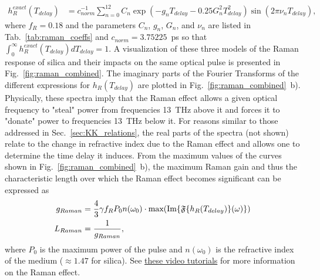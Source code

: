 \begin{align}
\label{eq:Raman_exact}
    h_R^{exact}(T_{delay})&=c^{-1}_{norm}\sum_{n=0}^{12}C_n\exp\left(- g_nT_{delay}-0.25G_n^2T^2_{delay}  \right)\sin\left(2\pi \nu_nT_{delay} \right),
\end{align}
where $f_R=0.18$ and the parameters $C_n$, $g_n$, $G_n$, and $\nu_n$ are listed in Tab.~\ref{tab:raman_coeffs} and $c_{norm}=3.75225$~ps so that $\int_0^\infty h_R^{exact}(T_{delay}) dT_{delay}=1$. A visualization of these three models of the Raman response of silica and their impacts on the same optical pulse is presented in Fig.~\ref{fig:raman_combined}. The imaginary parts of the Fourier Transforms of the different expressions for $h_R(T_{delay})$ are plotted in Fig.~\ref{fig:raman_combined}~b). Physically, these spectra imply that the Raman effect allows a given optical frequency to "steal" power from frequencies 13~THz above it and forces it to "donate" power to frequencies 13~THz below it. For reasons similar to those addressed in Sec.~\ref{sec:KK_relations}, the real parts of the spectra (not shown) relate to the change in refractive index due to the Raman effect and allows one to determine the time delay it induces. From the maximum values of the curves shown in Fig.~\ref{fig:raman_combined}~b), the maximum Raman gain and thus the characteristic length over which the Raman effect becomes significant can be expressed as
\begin{align}
    g_{Raman} &= \frac{4}{3} \gamma f_R P_0 n(\omega_0)\cdot \text{max}( \text{Im} \{ \mathfrak{F} \{ h_R(T_{delay}) \}(\omega) \} )\\ 
    L_{Raman} &= \frac{1}{g_{Raman}},
\end{align}
where $P_0$ is the maximum power of the pulse and $n(\omega_0)$ is the refractive index of the medium ($\approx 1.47$ for silica). See \href{https://www.youtube.com/playlist?list=PLdFybGSAoPnn6tnSmptR71zKAgcKsjIfi}{these video tutorials} for more information on the Raman effect.   

